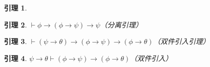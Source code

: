 \documentclass[punct=custom/kaiming,fontset=none]{ctexart}
\makeatletter
\renewenvironment{proof}[1][\proofname]{\par
  \pushQED{\qed}%
  \normalfont \topsep6\p@\@plus6\p@\relax
  \trivlist
  \item[\hskip\labelsep
    \bfseries
    #1%
    ]\ignorespaces
}{%
  \popQED\endtrivlist\@endpefalse
}
\newtheorem*{lemma*}{引理}
\theoremstyle{remark}
\let\proves\vdash
\makeatother
\begin{document}
\begin{description}
\begin{lemma*}
\begin{proof}
\begin{ND}
        \label{1}
        \label{2}
        \label{3}
        \label{4}
      \end{ND}
    \end{proof}
  \end{lemma*}
  \begin{lemma*}
    \label{lem:mp}
    \(\proves \phi \to (\phi \to \psi) \to \psi\)\hfill（分离引理）
    \begin{proof}
      \leavevmode
      \begin{ND}
        \label{1}
        \label{2}
        \label{3}
        \label{4}
      \end{ND}
    \end{proof}
  \end{lemma*}
  \begin{lemma*}
    \label{lem:condRepDist}
    \(\proves (\psi \to \theta) \to (\phi \to \psi) \to (\phi \to \theta)\)\hfill（双件引入引理）
    \begin{proof}
      \leavevmode
      \begin{ND}
        \label{1}
        \label{2}
      \end{ND}
    \end{proof}
  \end{lemma*}
  \begin{lemma*}
    \label{ded:condRepDist}
    \(\psi \to \theta \proves (\phi \to \psi) \to (\phi \to \theta)\)\hfill（双件引入）
    \begin{proof}
      \leavevmode
      \begin{ND}

\end{ND}
\end{proof}
\end{lemma*}
\end{description}
\end{document}

